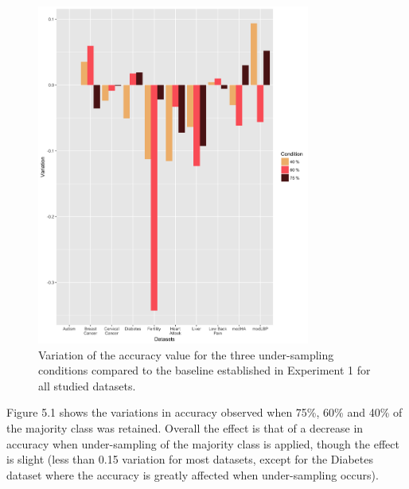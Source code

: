 \begin{figure}[!htbp]
    \centering
    \includegraphics[width=0.8\textwidth]{ThesisTemplate/usingLatex/chapter5Images/AccuVariationUnderBySets.png}
    \caption{Variation of the accuracy value for the three under-sampling conditions compared to the baseline established in Experiment 1 for all studied datasets.}
    \label{fig:accuVar}
\end{figure}

Figure 5.1 shows the variations in accuracy observed when 75\%, 60\% and 40\% of the majority class was retained.
Overall the effect is that of a decrease in accuracy when under-sampling of the  majority class is applied, though the effect is slight (less than 0.15 variation for most datasets, except for the Diabetes dataset where the accuracy is greatly affected when under-sampling occurs).\newline



